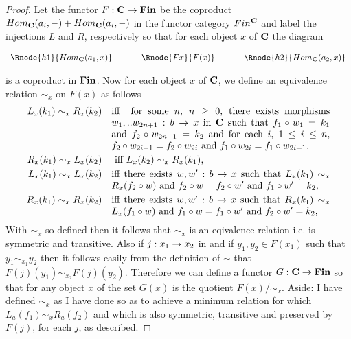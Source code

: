 \begin{proof}
Let the functor $F: \textbf{C} \rightarrow \textbf{Fin}$ be the coproduct $Hom_{\textbf{C}}(a_i,-) + Hom_{\textbf{C}}(a_i,-)$
in the functor category $Fin^{\textbf{C}}$ and label the injections $L$ and $R$, respectively so that
for each object $x$ of $\textbf{C}$ the diagram
\begin{center}
$
\begin{array}{c p{0.5cm} c p{0.5cm} c  }
\Rnode{h1}{Hom_{\catc}(a_1,x)}  &&\Rnode{Fx}{F(x)}  &&   \Rnode{h2}{Hom_{\catc}(a_2,x)}       
\end{array} 
$
\end{center}
is a coproduct in $\textbf{Fin}$.
Now for each object $x$ of $\textbf{C}$, we define an equivalence relation $\sim_x$ on $F(x)$ as follows
\begin{align*}
L_x(k_1) \sim_x R_x(k_2) &&&
 \parbox[t]{8cm}{ iff \representjointfd{x}{k_1}{k_2},}\\
R_x(k_1) \sim_x L_x(k_2) &&& \mbox{ iff $L_x(k_2) \sim_x R_x(k_1)$,} \\
L_x(k_1) \sim_x L_x(k_2) &&&
 \parbox[t]{8cm}{ iff there exists $w,w':b \morph x$ 
                  such that $L_x(k_1) \sim_x R_x(f_2 \circ w)$
                        and $f_2 \circ w = f_2 \circ w'$
                        and $f_1 \circ w' = k_2$,} \\
R_x(k_1) \sim_x R_x(k_2) &&&
 \parbox[t]{8cm}{ iff there exists $w,w':b \morph x$ 
                  such that $R_x(k_1) \sim_x L_x(f_1 \circ w)$
                        and $f_1 \circ w = f_1 \circ w'$
                        and $f_2 \circ w' = k_2$,} \\ 
\end{align*}
With $\sim_x$ so defined then it follows that $\sim_x$ is an eqivalence relation i.e. is symmetric and transitive.  
Also if $j: x_1 \rightarrow x_2$ in \catcw and if $y_1,y_2 \in F(x_1)$
such that $y_1 \sim_{x_1} y_2$
then it follows easily  from the definition of $\sim$
that $F(j)(y_1) \sim_{x_2} F(j)(y_2)$.
Therefore we can define a functor 
$G: \textbf{C} \rightarrow \textbf{Fin}$  so that for any object $x$ of %
the set $G(x)$ is the quotient $F(x)/{\sim_x}$.
Aside: I have defined $\sim_x$ as I have done so as to achieve a minimum relation 
for which $L_a(f_1) \sim_x R_a(f_2)$ and 
which is also symmetric, transitive and preserved by $F(j)$, for each $j$, as described. 


\end{proof}
